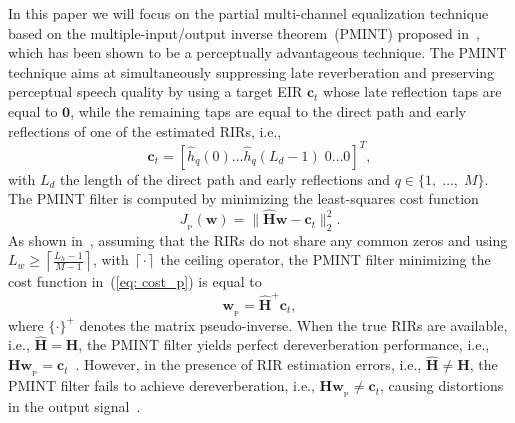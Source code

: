 \documentclass{article}
\begin{document}
In this paper we will focus on the partial multi-channel equalization technique based on the multiple-input/output inverse theorem~(PMINT) proposed in~\cite{Kodrasi_ITASLP_2013}, which has been shown to be a perceptually advantageous technique.
The PMINT technique aims at simultaneously suppressing late reverberation and preserving perceptual speech quality by using a target EIR $\mathbf{c}_t$ whose late reflection taps are equal to $\mathbf{0}$, while the remaining taps are equal to the direct path and early reflections of one of the estimated RIRs, i.e.,
\begin{equation}
\label{eq: eir_tar}
\mathbf{c}_t = [\hat{h}_q(0) \ldots \hat{h}_q(L_d-1) \; 0 \ldots 0]^T,
\end{equation}
with $L_d$ the length of the direct path and early reflections and $q \in \{1, \; \ldots, \; M \}$.
The PMINT filter is computed by minimizing the least-squares cost function
\begin{equation}
\label{eq: cost_p}
J_{_{\text{P}}}(\mathbf{w}) = \|\hat{\mathbf{H}}\mathbf{w} - \mathbf{c}_t \|_2^2.
\end{equation}
As shown in~\cite{Miyoshi_ITASS_1988,Kodrasi_ITASLP_2013}, assuming that the RIRs do not share any common zeros and using $L_w \geq \left\lceil{\frac{L_h-1}{M-1}}\right\rceil$, with $\left\lceil{\cdot}\right\rceil$ the ceiling operator, the PMINT filter minimizing the cost function in~(\ref{eq: cost_p}) is equal to
\begin{equation}
\label{eq: w_pmint}
\mathbf{w}_{_{\text{P}}} = \hat{\mathbf{H}}^+\mathbf{c}_t,
\end{equation}
where $\{ \cdot \}^+$ denotes the matrix pseudo-inverse. 
When the true RIRs are available, i.e., $\hat{\mathbf{H}} = \mathbf{H}$, the PMINT filter yields perfect dereverberation performance, i.e., $\mathbf{H}\mathbf{w}_{_{\text{P}}} = \mathbf{c}_t$~\cite{Kodrasi_ITASLP_2013}.
However, in the presence of RIR estimation errors, i.e., $\hat{\mathbf{H}} \neq \mathbf{H}$, the PMINT filter fails to achieve dereverberation, i.e., $\mathbf{H}\mathbf{w}_{_{\text{P}}} \neq \mathbf{c}_t$, causing distortions in the output signal~\cite{Kodrasi_ITASLP_2013}.
\end{document}
